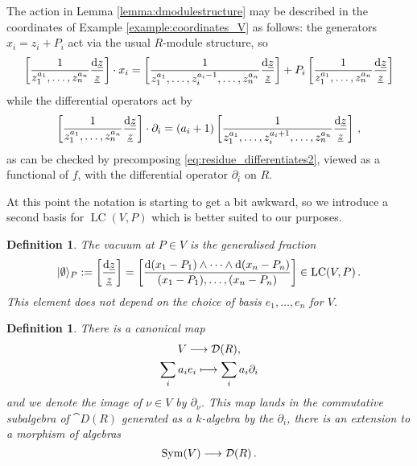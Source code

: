 \documentclass[english,letter paper,12pt,reqno]{article}
\DeclarePairedDelimiter\ket{\lvert}{\rangle}
\theoremstyle{example}
\newtheorem{definition}[theorem]{Definition}
\numberwithin{equation}{section}
\def\vacu{\ket{\emptyset}}
\DeclareMathOperator{\Sym}{Sym}
\DeclareMathOperator{\LC}{LC}
\begin{document}
The action in Lemma \ref{lemma:dmodulestructure} may be described in the coordinates of Example \ref{example:coordinates_V} as follows: the generators $x_i = z_i + P_i$ act via the usual $R$-module structure, so
\begin{equation}
\left[ \frac{1}{z_1^{a_1}, \ldots, z_n^{a_n}} \frac{\operatorname{d}\!{\underline{z}}}{\underline{z}} \right] \cdot x_i = \left[ \frac{1}{z_1^{a_1}, \ldots, z_i^{a_i-1}, \ldots, z_n^{a_n}} \frac{\operatorname{d}\!{\underline{z}}}{\underline{z}} \right] + P_i \left[ \frac{1}{z_1^{a_1}, \ldots, z_n^{a_n}} \frac{\operatorname{d}\!{\underline{z}}}{\underline{z}} \right]
\end{equation}
while the differential operators act by
\begin{equation}\label{eq:action_diff_op}
\left[ \frac{1}{z_1^{a_1}, \ldots, z_n^{a_n}} \frac{\operatorname{d}\!{\underline{z}}}{\underline{z}} \right] \cdot \partial_i = (a_i + 1) \left[ \frac{1}{z_1^{a_1}, \ldots, z_i^{a_i+1}, \ldots, z_n^{a_n}} \frac{\operatorname{d}\!{\underline{z}}}{\underline{z}} \right]\,,
\end{equation}
as can be checked by precomposing \eqref{eq:residue_differentiates2}, viewed as a functional of $f$, with the differential operator $\partial_i$ on $R$. 

At this point the notation is starting to get a bit awkward, so we introduce a second basis for $\LC(V,P)$ which is better suited to our purposes.

\begin{definition} The \emph{vacuum} at $P \in V$ is the generalised fraction
\[
\vacu_P := \left[ \frac{\ud{\underline{z}}}{\underline{z}} \right] = \left[ \frac{\ud{(x_1-P_1)} \wedge \cdots \wedge \ud{(x_n - P_n)}}{(x_1-P_1), \ldots, (x_n-P_n)} \right] \in \LC(V,P)\,.
\]
This element does not depend on the choice of basis $e_1,\ldots,e_n$ for $V$.
\end{definition}

\begin{definition}\label{def:symvtoder} There is a canonical map
\begin{gather*}
V \longrightarrow \mathcal{D}(R),\\
\sum_i a_i e_i \longmapsto \sum_i a_i \partial_i
\end{gather*}
and we denote the image of $\nu \in V$ by $\partial_{\nu}$. This map lands in the commutative subalgebra of $\cat{D}(R)$ generated as a $k$-algebra by the $\partial_i$, there is an extension to a morphism of algebras
\begin{equation}\label{eq:symvtoder}
\Sym(V) \lto \cat{D}(R)\,.
\end{equation}
\end{definition}
\end{document}
